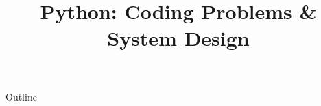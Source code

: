 \documentclass[xcolor=dvipsnames,compress,t,pdf]{beamer}
\title[\insertframenumber /\inserttotalframenumber]{Python: Coding Problems \& System Design}
\begin{document}
	\begin{frame}
	\titlepage
	\end{frame}

	\begin{frame}{Outline}
	    \tableofcontents
	\end{frame}

	
	
	
\end{document}
